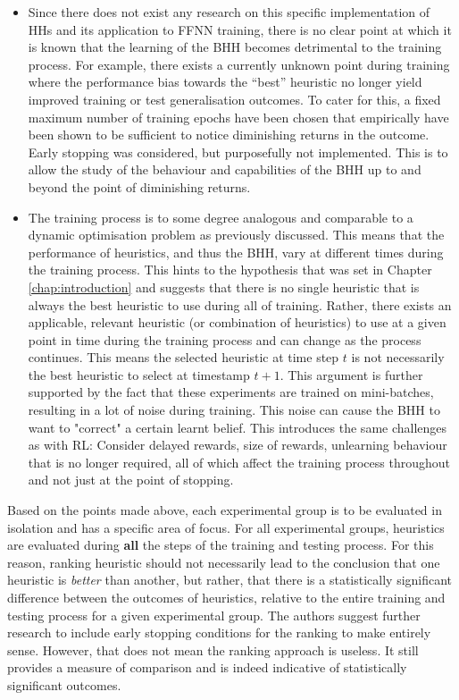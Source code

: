 \begin{itemize}
    \item
    Since there does not exist any research on this specific implementation of \acp{HH} and its application to \acs{FFNN} training, there is no clear point at which it is known that the learning of the \acs{BHH} becomes detrimental to the training process. For example, there exists a currently unknown point during training where the performance bias towards the ``best'' heuristic no longer yield improved training or test generalisation outcomes. To cater for this, a fixed maximum number of training epochs have been chosen that empirically have been shown to be sufficient to notice diminishing returns in the outcome. Early stopping was considered, but purposefully not implemented. This is to allow the study of the behaviour and capabilities of the \Acs{BHH} up to and beyond the point of diminishing returns. 
    
    \item
    The training process is to some degree analogous and comparable to a dynamic optimisation problem as previously discussed. This means that the performance of heuristics, and thus the \Acs{BHH}, vary at different times during the training process. This hints to the hypothesis that was set in Chapter \ref{chap:introduction} and suggests that there is no single heuristic that is always the best heuristic to use during all of training. Rather, there exists an applicable, relevant heuristic (or combination of heuristics) to use at a given point in time during the training process and can change as the process continues. This means the selected heuristic at time step $t$ is not necessarily the best heuristic to select at timestamp $t+1$. This argument is further supported by the fact that these experiments are trained on mini-batches, resulting in a lot of noise during training. This noise can cause the \Ac{BHH} to want to "correct" a certain learnt belief. This introduces the same challenges as with \Ac{RL}: Consider delayed rewards, size of rewards, unlearning behaviour that is no longer required, all of which affect the training process throughout and not just at the point of stopping.
\end{itemize}


Based on the points made above, each experimental group is to be evaluated in isolation and has a specific area of focus. For all experimental groups, heuristics are evaluated during \textbf{all} the steps of the training and testing process. For this reason, ranking heuristic should not necessarily lead to the conclusion that one heuristic is \textit{better} than another, but rather, that there is a statistically significant difference between the outcomes of heuristics, relative to the entire training and testing process for a given experimental group. The authors suggest further research to include early stopping conditions for the ranking to make entirely sense. However, that does not mean the ranking approach is useless. It still provides a measure of comparison and is indeed indicative of statistically significant outcomes.


